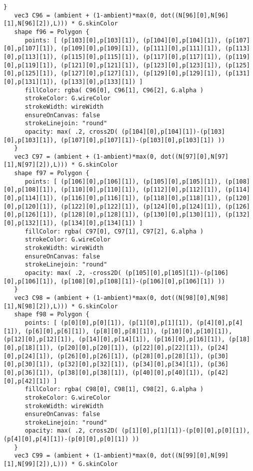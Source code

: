 \begin{lstlisting}[language=Sty-RT,escapechar=@]
   }
   vec3 C96 = (ambient + (1-ambient)*max(0, dot((N[96][0],N[96][1],N[96][2]),L))) * G.skinColor
   shape f96 = Polygon {
      points: [ (p[103][0],p[103][1]), (p[104][0],p[104][1]), (p[107][0],p[107][1]), (p[109][0],p[109][1]), (p[111][0],p[111][1]), (p[113][0],p[113][1]), (p[115][0],p[115][1]), (p[117][0],p[117][1]), (p[119][0],p[119][1]), (p[121][0],p[121][1]), (p[123][0],p[123][1]), (p[125][0],p[125][1]), (p[127][0],p[127][1]), (p[129][0],p[129][1]), (p[131][0],p[131][1]), (p[133][0],p[133][1]) ]
      fillColor: rgba( C96[0], C96[1], C96[2], G.alpha )
      strokeColor: G.wireColor
      strokeWidth: wireWidth
      ensureOnCanvas: false
      strokeLinejoin: "round"
      opacity: max( .2, cross2D( (p[104][0],p[104][1])-(p[103][0],p[103][1]), (p[107][0],p[107][1])-(p[103][0],p[103][1]) ))
   }
   vec3 C97 = (ambient + (1-ambient)*max(0, dot((N[97][0],N[97][1],N[97][2]),L))) * G.skinColor
   shape f97 = Polygon {
      points: [ (p[106][0],p[106][1]), (p[105][0],p[105][1]), (p[108][0],p[108][1]), (p[110][0],p[110][1]), (p[112][0],p[112][1]), (p[114][0],p[114][1]), (p[116][0],p[116][1]), (p[118][0],p[118][1]), (p[120][0],p[120][1]), (p[122][0],p[122][1]), (p[124][0],p[124][1]), (p[126][0],p[126][1]), (p[128][0],p[128][1]), (p[130][0],p[130][1]), (p[132][0],p[132][1]), (p[134][0],p[134][1]) ]
      fillColor: rgba( C97[0], C97[1], C97[2], G.alpha )
      strokeColor: G.wireColor
      strokeWidth: wireWidth
      ensureOnCanvas: false
      strokeLinejoin: "round"
      opacity: max( .2, -cross2D( (p[105][0],p[105][1])-(p[106][0],p[106][1]), (p[108][0],p[108][1])-(p[106][0],p[106][1]) ))
   }
   vec3 C98 = (ambient + (1-ambient)*max(0, dot((N[98][0],N[98][1],N[98][2]),L))) * G.skinColor
   shape f98 = Polygon {
      points: [ (p[0][0],p[0][1]), (p[1][0],p[1][1]), (p[4][0],p[4][1]), (p[6][0],p[6][1]), (p[8][0],p[8][1]), (p[10][0],p[10][1]), (p[12][0],p[12][1]), (p[14][0],p[14][1]), (p[16][0],p[16][1]), (p[18][0],p[18][1]), (p[20][0],p[20][1]), (p[22][0],p[22][1]), (p[24][0],p[24][1]), (p[26][0],p[26][1]), (p[28][0],p[28][1]), (p[30][0],p[30][1]), (p[32][0],p[32][1]), (p[34][0],p[34][1]), (p[36][0],p[36][1]), (p[38][0],p[38][1]), (p[40][0],p[40][1]), (p[42][0],p[42][1]) ]
      fillColor: rgba( C98[0], C98[1], C98[2], G.alpha )
      strokeColor: G.wireColor
      strokeWidth: wireWidth
      ensureOnCanvas: false
      strokeLinejoin: "round"
      opacity: max( .2, cross2D( (p[1][0],p[1][1])-(p[0][0],p[0][1]), (p[4][0],p[4][1])-(p[0][0],p[0][1]) ))
   }
   vec3 C99 = (ambient + (1-ambient)*max(0, dot((N[99][0],N[99][1],N[99][2]),L))) * G.skinColor

\end{lstlisting}
